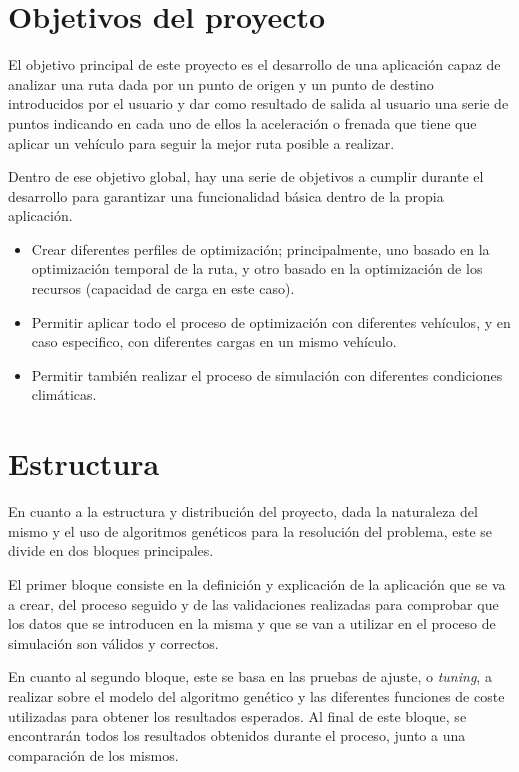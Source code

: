 \documentclass[11pt,spanish,listoffigures,listoftables]{tfgetsinf}
\begin{document}
\section{Objetivos del proyecto}
El objetivo principal de este proyecto es el desarrollo de una aplicación capaz de analizar una ruta dada por un punto de origen y un punto de destino introducidos por el usuario y dar como resultado de salida al usuario una serie de puntos indicando en cada uno de ellos la aceleración o frenada que tiene que aplicar un vehículo para seguir la mejor ruta posible a realizar.

Dentro de ese objetivo global, hay una serie de objetivos a cumplir durante el desarrollo para garantizar una funcionalidad básica dentro de la propia aplicación.
\begin{itemize}
    \item Crear diferentes perfiles de optimización; principalmente, uno basado en la optimización temporal de la ruta, y otro basado en la optimización de los recursos (capacidad de carga en este caso).
    \item Permitir aplicar todo el proceso de optimización con diferentes vehículos, y en caso especifico, con diferentes cargas en un mismo vehículo.
    \item Permitir también realizar el proceso de simulación con diferentes condiciones climáticas.
\end{itemize}
 
\section{Estructura}
En cuanto a la estructura y distribución del proyecto, dada la naturaleza del mismo y el uso de algoritmos genéticos para la resolución del problema, este se divide en dos bloques principales.

El primer bloque consiste en la definición y explicación de la aplicación que se va a crear, del proceso seguido y de las validaciones realizadas para comprobar que los datos que se introducen en la misma y que se van a utilizar en el proceso de simulación son válidos y correctos.

En cuanto al segundo bloque, este se basa en las pruebas de ajuste, o \textit{tuning}, a realizar sobre el modelo del algoritmo genético y las diferentes funciones de coste utilizadas para obtener los resultados esperados. Al final de este bloque, se encontrarán todos los resultados obtenidos durante el proceso, junto a una comparación de los mismos.
\end{document}
